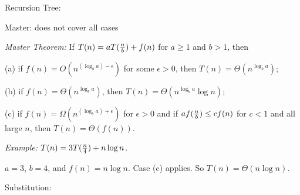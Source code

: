 Recursion Tree:

Master: does not cover all cases

{\em Master Theorem:} If $T(n)=aT({n\over b})+f(n)$ for $a\ge1$ and $b>1$, then

(a) if $f(n)=O(n^{(\log_ba)-\epsilon})$ for some $\epsilon>0$, then
$T(n)=\Theta(n^{\log_ba})$;

(b) if $f(n)=\Theta(n^{\log_ba})$, then
$T(n)=\Theta(n^{\log_ba}\log n)$;

(c) if $f(n)=\Omega(n^{(\log_ba)+\epsilon})$ for $\epsilon>0$ and if
$af({n\over b})\le cf(n)$ for $c<1$ and all large $n$, then
$T(n)=\Theta(f(n))$.


{\em Example:} $T(n)=3T({n\over4})+n\log n$.

$a=3$, $b=4$, and $f(n)=n\log n$.
Case (c) applies. So $T(n)=\Theta(n\log n)$.

Substitution:
